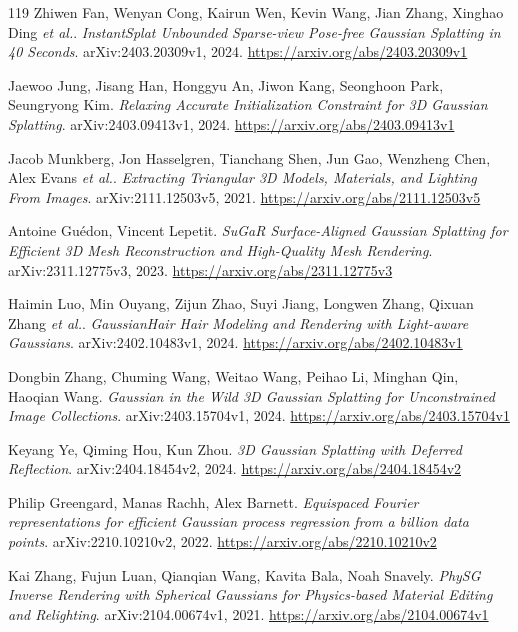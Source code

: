 \documentclass[11pt,a4paper]{article}
\begin{document}
\begin{thebibliography}{119}
Zhiwen Fan, Wenyan Cong, Kairun Wen, Kevin Wang, Jian Zhang, Xinghao Ding \emph{et al.}.
\newblock \emph{InstantSplat Unbounded Sparse-view Pose-free Gaussian Splatting in 40 Seconds}.
\newblock arXiv:2403.20309v1, 2024.
\newblock \url{https://arxiv.org/abs/2403.20309v1}

Jaewoo Jung, Jisang Han, Honggyu An, Jiwon Kang, Seonghoon Park, Seungryong Kim.
\newblock \emph{Relaxing Accurate Initialization Constraint for 3D Gaussian Splatting}.
\newblock arXiv:2403.09413v1, 2024.
\newblock \url{https://arxiv.org/abs/2403.09413v1}

Jacob Munkberg, Jon Hasselgren, Tianchang Shen, Jun Gao, Wenzheng Chen, Alex Evans \emph{et al.}.
\newblock \emph{Extracting Triangular 3D Models, Materials, and Lighting From Images}.
\newblock arXiv:2111.12503v5, 2021.
\newblock \url{https://arxiv.org/abs/2111.12503v5}

Antoine Gu\'{e}don, Vincent Lepetit.
\newblock \emph{SuGaR Surface-Aligned Gaussian Splatting for Efficient 3D Mesh Reconstruction and High-Quality Mesh Rendering}.
\newblock arXiv:2311.12775v3, 2023.
\newblock \url{https://arxiv.org/abs/2311.12775v3}

Haimin Luo, Min Ouyang, Zijun Zhao, Suyi Jiang, Longwen Zhang, Qixuan Zhang \emph{et al.}.
\newblock \emph{GaussianHair Hair Modeling and Rendering with Light-aware Gaussians}.
\newblock arXiv:2402.10483v1, 2024.
\newblock \url{https://arxiv.org/abs/2402.10483v1}

Dongbin Zhang, Chuming Wang, Weitao Wang, Peihao Li, Minghan Qin, Haoqian Wang.
\newblock \emph{Gaussian in the Wild 3D Gaussian Splatting for Unconstrained Image Collections}.
\newblock arXiv:2403.15704v1, 2024.
\newblock \url{https://arxiv.org/abs/2403.15704v1}

Keyang Ye, Qiming Hou, Kun Zhou.
\newblock \emph{3D Gaussian Splatting with Deferred Reflection}.
\newblock arXiv:2404.18454v2, 2024.
\newblock \url{https://arxiv.org/abs/2404.18454v2}

Philip Greengard, Manas Rachh, Alex Barnett.
\newblock \emph{Equispaced Fourier representations for efficient Gaussian process regression from a billion data points}.
\newblock arXiv:2210.10210v2, 2022.
\newblock \url{https://arxiv.org/abs/2210.10210v2}

Kai Zhang, Fujun Luan, Qianqian Wang, Kavita Bala, Noah Snavely.
\newblock \emph{PhySG Inverse Rendering with Spherical Gaussians for Physics-based Material Editing and Relighting}.
\newblock arXiv:2104.00674v1, 2021.
\newblock \url{https://arxiv.org/abs/2104.00674v1}


\end{thebibliography}
\end{document}
